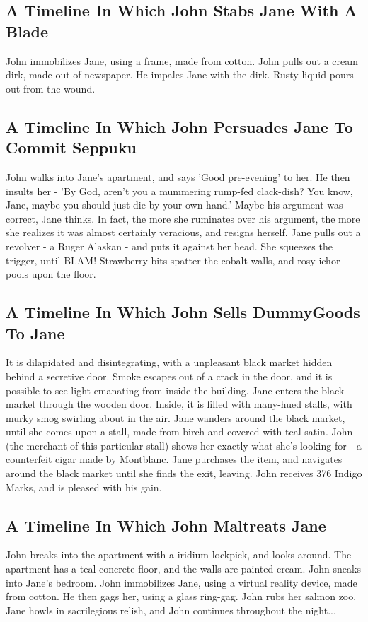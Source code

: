 \documentclass{article}
\begin{document}
\subsection{A Timeline In Which John Stabs Jane With A Blade}


John immobilizes Jane, using a frame, made from cotton.
John pulls out a cream dirk, made out of newspaper.
He impales Jane with the dirk.
Rusty liquid pours out from the wound.
\subsection{A Timeline In Which John Persuades Jane To Commit Seppuku}


John walks into Jane's apartment, and says 'Good pre{-}evening' to her.
He then insults her {-} 'By God, aren't you a mummering rump{-}fed clack{-}dish?
You know, Jane, maybe you should just die by your own hand.'
Maybe his argument was correct, Jane thinks.
In fact, the more she ruminates over his argument, the more she realizes it was almost certainly veracious, and resigns herself.
Jane pulls out a revolver {-} a Ruger Alaskan {-} and puts it against her head.
She squeezes the trigger, until BLAM!
Strawberry bits spatter the cobalt walls, and rosy ichor pools upon the floor.
\subsection{A Timeline In Which John Sells DummyGoods To Jane}


It is dilapidated and disintegrating, with a unpleasant black market hidden behind a secretive door.
Smoke escapes out of a crack in the door, and it is possible to see light emanating from inside the building.
Jane enters the black market through the wooden door.
Inside, it is filled with many{-}hued stalls, with murky smog swirling about in the air.
Jane wanders around the black market, until she comes upon a stall, made from birch and covered with teal satin.
John (the merchant of this particular stall) shows her exactly what she's looking for {-} a counterfeit cigar made by Montblanc.
Jane purchases the item, and navigates around the black market until she finds the exit, leaving.
John receives 376 Indigo Marks, and is pleased with his gain.
\subsection{A Timeline In Which John Maltreats Jane}


John breaks into the apartment with a iridium lockpick, and looks around.
The apartment has a teal concrete floor, and the walls are painted cream.
John sneaks into Jane's bedroom.
John immobilizes Jane, using a virtual reality device, made from cotton.
He then gags her, using a glass ring{-}gag.
John rubs her salmon zoo.
Jane howls in sacrilegious relish, and John continues throughout the night...
\end{document}
